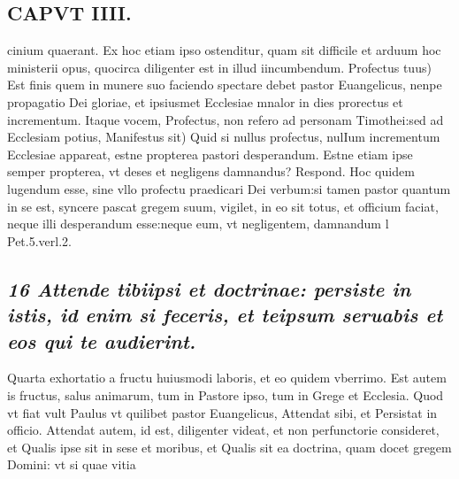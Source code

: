 \documentclass{article}
\begin{document}
\begin{pages}
\section*{CAPVT  IIII. }
\marginpar{[ p.237 ]}\pstart cinium quaerant. Ex hoc etiam ipso ostenditur, quam sit difficile et arduum hoc ministerii opus, quocirca diligenter est in illud iincumbendum. Profectus tuus) Est finis quem in munere suo faciendo spectare debet pastor Euangelicus, nenpe propagatio Dei gloriae, et ipsiusmet Ecclesiae mnalor in dies prorectus et incrementum. Itaque vocem, Profectus, non refero ad personam Timothei:sed ad Ecclesiam potius,  \pend\pstart Manifestus sit) Quid si nullus profectus, nulIum incrementum Ecclesiae appareat, estne propterea pastori desperandum. Estne etiam ipse semper propterea, vt deses et negligens damnandus? Respond. Hoc quidem lugendum esse, sine vllo profectu praedicari Dei verbum:si tamen pastor quantum in se est, syncere pascat gregem suum, vigilet, in eo sit totus, et officium faciat, neque illi desperandum esse:neque eum, vt negligentem, damnandum l Pet.5.verl.2.  \pend
{}
{}
\subsection*{\textit{16 Attende tibiipsi et doctrinae: persiste in istis, id enim si feceris, et teipsum seruabis et eos qui te audierint. }}\pstart Quarta exhortatio a fructu huiusmodi laboris, et eo quidem vberrimo. Est autem is fructus, salus animarum, tum in Pastore ipso, tum in Grege et Ecclesia. Quod vt fiat vult Paulus vt quilibet pastor Euangelicus, Attendat sibi, et Persistat in officio. Attendat autem, id est, diligenter videat, et non perfunctorie consideret, et Qualis ipse sit in sese et moribus, et Qualis sit ea doctrina, quam docet gregem Domini: vt si quae vitia  \pend

\end{pages}
\end{document}
